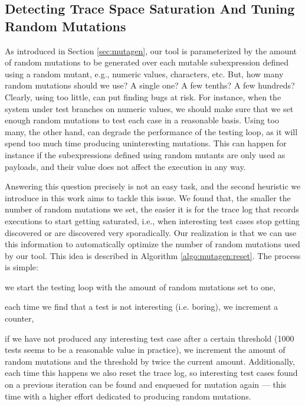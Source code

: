\documentclass[acmsmall, anonymous]{acmart}
\begin{document}
\subsection{Detecting Trace Space Saturation And Tuning Random Mutations}

As introduced in Section \ref{sec:mutagen}, our tool is parameterized by the
amount of random mutations to be generated over each mutable subexpression
defined using a random mutant, e.g., numeric values, characters, etc.
%
But, how many random mutations should we use? A single one? A few tenths? A few
hundreds?
%
Clearly, using too little, can put finding bugs at risk.
%
For instance, when the system under test branches on numeric values, we should
make sure that we set enough random mutations to test each case in a reasonable
basis.
%
Using too many, the other hand, can degrade the performance of the testing
loop, as it will spend too much time producing uninteresting mutations.
%
This can happen for instance if the subexpressions defined using random mutants
are only used as payloads, and their value does not affect the execution in any
way.


Answering this question precisely is not an easy task, and the second heuristic
we introduce in this work aims to tackle this issue.
%
We found that, the smaller the number of random mutations we set, the easier it
is for the trace log that records executions to start getting saturated, i.e.,
when interesting test cases stop getting discovered or are discovered very
sporadically.
%
Our realization is that we can use this information to automatically optimize
the number of random mutations used by our tool.
%
This idea is described in Algorithm \ref{algo:mutagen:reset}.
%
The process is simple:
%
\begin{inparaenum}
  \item we start the testing loop with the amount of random mutations set to one,
  \item each time we find that a test is not interesting (i.e. boring), we
    increment a counter,
  \item if we have not produced any interesting test case after a certain
    threshold (1000 tests seems to be a reasonable value in practice), we
    increment the amount of random mutations and the threshold by twice the
    current amount.
    Additionally, each time this happens we also reset the trace log, so
    interesting test cases found on a previous iteration can be found and
    enqueued for mutation again --- this time with a higher effort dedicated to
    producing random mutations.
\end{inparaenum}
\end{document}
